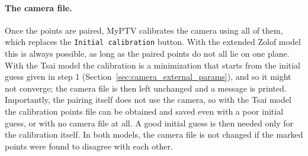 \documentclass[10pt,a4paper]{article}
\begin{document}
\paragraph{The camera file.} Once the points are paired, MyPTV calibrates the camera using all of them, which replaces the \texttt{Initial calibration} button. With the extended Zolof model this is always possible, as long as the paired points do not all lie on one plane. With the Tsai model the calibration is a minimization that starts from the initial guess given in step 1 (Section~\ref{sec:camera_external_params}), and so it might not converge; the camera file is then left unchanged and a message is printed. Importantly, the pairing itself does not use the camera, so with the Tsai model the calibration points file can be obtained and saved even with a poor initial guess, or with no camera file at all. A good initial guess is then needed only for the calibration itself. In both models, the camera file is not changed if the marked points were found to disagree with each other. 
\end{document}
